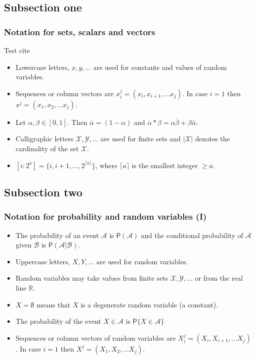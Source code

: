 \documentclass{beamer}
\begin{document}
\subsection{Subsection one}
\begin{frame}
\frametitle{Notation for sets, scalars and vectors}
Test cite \cite{telatar99}
\begin{itemize}
\item Lowercase letters, $x,y,...$ are used for constants and values of random variables. \item Sequences or column vectors are $x_i^j=(x_i, x_{i+1}, ...x_j)$. In case $i=1$ then $x^j=(x_1, x_2, ...x_j)$.
\item Let $\alpha, \beta \in [0,1]$. Then $\bar{\alpha}=(1-\alpha)$ and $\alpha * \beta = \alpha \bar{\beta}+\beta \bar{\alpha}$.
\item Calligraphic letters $\mathcal{X,Y, ...}$ are used for finite sets and $|\mathcal{X}|$ denotes the cardinality of the set $\mathcal{X}$.
\item $[i:2^a]=\{i, i+1, ..., 2^{\lceil{a}\rceil}\}$, where $\lceil{a}\rceil$ is the smallest integer $\geq a$.
\end{itemize}
\end{frame}


\subsection{Subsection two}
\begin{frame}
\frametitle{Notation for probability and random variables (I)}
\begin{itemize}
\item The probability of an event $\mathcal A$ is $\mathsf P(\mathcal A)$ and the conditional probability of $\mathcal A$ given $\mathcal B$ is $\mathsf P(\mathcal A|\mathcal B)$.
\item Uppercase letters, $X,Y,...$ are used for random variables.
\item Random variables may take values from finite sets $\mathcal{X,Y, ...}$ or from the real line $\mathbb R$.
\item $X=\emptyset$ means that $X$ is a degenerate random variable (a constant).
\item The probability of the event $X\in \mathcal A$ is $\mathsf P\{X\in \mathcal A\}$
\item Sequences or column vectors of random variables are $X_i^j=(X_i, X_{i+1}, ...X_j)$. In case $i=1$ then $X^j=(X_1, X_2, ...X_j)$.
\end{itemize}
\end{frame}
\end{document}
